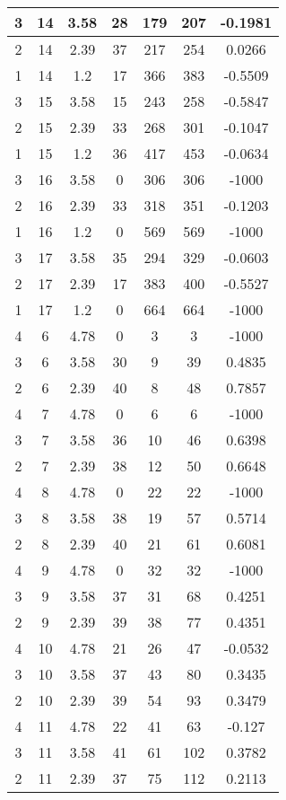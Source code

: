 \documentclass[letterpaper, 12pt]{article}
\begin{document}
\begin{longtable}{|c|c|c|c|c|c|c|}
\hline
3 & 14 & 3.58 & 28 & 179 & 207 & -0.1981 \\
\hline
2 & 14 & 2.39 & 37 & 217 & 254 & 0.0266 \\
\hline
1 & 14 & 1.2 & 17 & 366 & 383 & -0.5509 \\
\hline
3 & 15 & 3.58 & 15 & 243 & 258 & -0.5847 \\
\hline
2 & 15 & 2.39 & 33 & 268 & 301 & -0.1047 \\
\hline
1 & 15 & 1.2 & 36 & 417 & 453 & -0.0634 \\
\hline
3 & 16 & 3.58 & 0 & 306 & 306 & -1000 \\
\hline
2 & 16 & 2.39 & 33 & 318 & 351 & -0.1203 \\
\hline
1 & 16 & 1.2 & 0 & 569 & 569 & -1000 \\
\hline
3 & 17 & 3.58 & 35 & 294 & 329 & -0.0603 \\
\hline
2 & 17 & 2.39 & 17 & 383 & 400 & -0.5527 \\
\hline
1 & 17 & 1.2 & 0 & 664 & 664 & -1000 \\
\hline
4 & 6 & 4.78 & 0 & 3 & 3 & -1000 \\
\hline
3 & 6 & 3.58 & 30 & 9 & 39 & 0.4835 \\
\hline
2 & 6 & 2.39 & 40 & 8 & 48 & 0.7857 \\
\hline
4 & 7 & 4.78 & 0 & 6 & 6 & -1000 \\
\hline
3 & 7 & 3.58 & 36 & 10 & 46 & 0.6398 \\
\hline
2 & 7 & 2.39 & 38 & 12 & 50 & 0.6648 \\
\hline
4 & 8 & 4.78 & 0 & 22 & 22 & -1000 \\
\hline
3 & 8 & 3.58 & 38 & 19 & 57 & 0.5714 \\
\hline
2 & 8 & 2.39 & 40 & 21 & 61 & 0.6081 \\
\hline
4 & 9 & 4.78 & 0 & 32 & 32 & -1000 \\
\hline
3 & 9 & 3.58 & 37 & 31 & 68 & 0.4251 \\
\hline
2 & 9 & 2.39 & 39 & 38 & 77 & 0.4351 \\
\hline
4 & 10 & 4.78 & 21 & 26 & 47 & -0.0532 \\
\hline
3 & 10 & 3.58 & 37 & 43 & 80 & 0.3435 \\
\hline
2 & 10 & 2.39 & 39 & 54 & 93 & 0.3479 \\
\hline
4 & 11 & 4.78 & 22 & 41 & 63 & -0.127 \\
\hline
3 & 11 & 3.58 & 41 & 61 & 102 & 0.3782 \\
\hline
2 & 11 & 2.39 & 37 & 75 & 112 & 0.2113 \\

\end{longtable}
\end{document}
